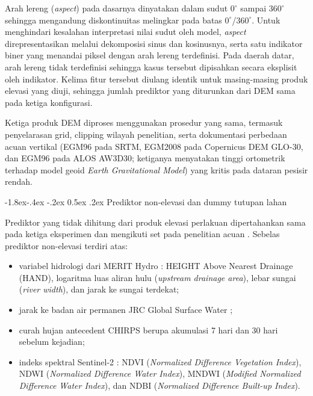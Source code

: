 \documentclass[12pt,a4paper]{article}
\makeatletter
\renewcommand\subsubsection{\@startsection{subsubsection}{3}{\z@}%
  {-1.8ex\@plus -.4ex \@minus -.2ex}%
  {0.5ex \@plus .2ex}%
  {\normalfont\normalsize\bfseries}}
\makeatother
\begin{document}
Arah lereng (\textit{aspect}) pada dasarnya dinyatakan dalam sudut $0^{\circ}$
sampai $360^{\circ}$ sehingga mengandung diskontinuitas melingkar pada batas
$0^{\circ}$/$360^{\circ}$. Untuk menghindari kesalahan interpretasi nilai
sudut oleh model, \textit{aspect} direpresentasikan melalui dekomposisi
sinus dan kosinusnya, serta satu indikator biner yang menandai piksel dengan
arah lereng terdefinisi. Pada daerah datar, arah lereng tidak terdefinisi
sehingga kasus tersebut dipisahkan secara eksplisit oleh indikator. Kelima fitur tersebut
diulang identik untuk masing-masing produk elevasi yang diuji, sehingga jumlah
prediktor yang diturunkan dari DEM sama pada ketiga konfigurasi.

Ketiga produk DEM diproses menggunakan prosedur yang sama, termasuk
penyelarasan grid, clipping wilayah penelitian, serta dokumentasi perbedaan
acuan vertikal (EGM96 pada SRTM, EGM2008 pada Copernicus
DEM GLO-30, dan EGM96 pada ALOS AW3D30; ketiganya menyatakan tinggi
ortometrik terhadap model geoid \textit{Earth Gravitational Model})
yang kritis pada dataran pesisir rendah.

\subsubsection{Prediktor non-elevasi dan dummy tutupan lahan}

Prediktor yang tidak dihitung dari produk elevasi perlakuan dipertahankan
sama pada ketiga eksperimen dan mengikuti set pada penelitian acuan
\citep{hakim2026}. Sebelas prediktor non-elevasi terdiri atas:

\begin{itemize}
\item variabel hidrologi dari MERIT Hydro \citep{yamazaki2019}: HEIGHT
Above Nearest Drainage (HAND), logaritma luas aliran hulu
(\textit{upstream drainage area}), lebar sungai (\textit{river width}), dan
jarak ke sungai terdekat;
\item jarak ke badan air permanen JRC Global Surface Water
\citep{pekel2016};
\item curah hujan antecedent CHIRPS \citep{funk2015} berupa akumulasi 7 hari
dan 30 hari sebelum kejadian;
\item indeks spektral Sentinel-2 \citep{saha2021}: NDVI
(\textit{Normalized Difference Vegetation Index}), NDWI
(\textit{Normalized Difference Water Index}), MNDWI (\textit{Modified
Normalized Difference Water Index}), dan NDBI (\textit{Normalized
Difference Built-up Index}).
\end{itemize}
\end{document}
